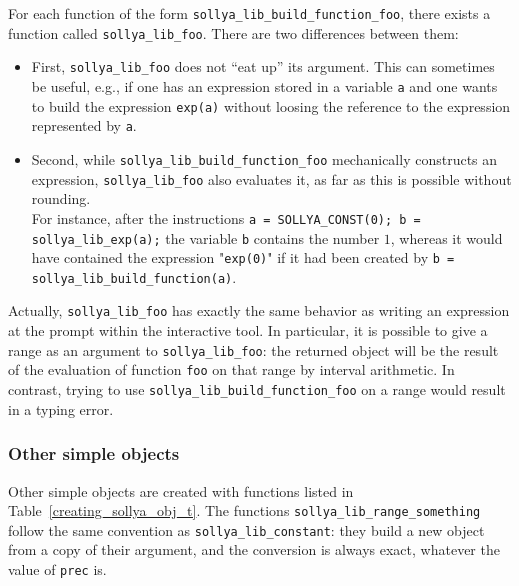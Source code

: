 \documentclass[a4paper]{article}
\begin{document}
For each function of the form \verb|sollya_lib_build_function_foo|, there exists a function called \verb|sollya_lib_foo|. There are two differences between them:
\begin{itemize}
\item First, \verb|sollya_lib_foo| does not ``eat up'' its argument. This can sometimes be useful, e.g., if one has an expression stored in a variable \texttt{a} and one wants to build the expression \texttt{exp(a)} without loosing the reference to the expression represented by \texttt{a}.
\item Second, while \verb|sollya_lib_build_function_foo| mechanically constructs an expression, \verb|sollya_lib_foo| also evaluates it, as far as this is possible without rounding.\\
For instance, after the instructions \verb|a = SOLLYA_CONST(0); b = sollya_lib_exp(a);| the variable \texttt{b} contains the number $1$, whereas it would have contained the expression "\texttt{exp(0)}" if it had been created by \verb|b = sollya_lib_build_function(a)|.
\end{itemize}
Actually, \verb|sollya_lib_foo| has exactly the same behavior as writing an expression at the prompt within the interactive tool. In particular, it is possible to give a range as an argument to \verb|sollya_lib_foo|: the returned object will be the result of the evaluation of function \verb|foo| on that range by interval arithmetic. In contrast, trying to use \verb|sollya_lib_build_function_foo| on a range would result in a typing error.

\subsubsection{Other simple objects}
Other simple objects are created with functions listed in Table~\ref{creating_sollya_obj_t}. The functions \texttt{sollya\_lib\_range\_something} follow the same convention as \texttt{sollya\_lib\_constant}: they build a new object from a copy of their argument, and the conversion is always exact, whatever the value of \texttt{prec} is.
\end{document}
